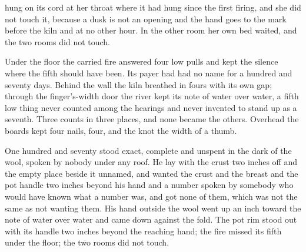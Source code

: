  hung on its cord at her throat where it had hung since the first firing, and she did not touch it, because a dusk is not an opening and the hand goes to the mark before the kiln and at no other hour. In the other room her own bed waited, and the two rooms did not touch.

Under the floor the carried fire answered four low pulls and kept the silence where the fifth should have been. Its payer had had no name for a hundred and seventy days. Behind the wall the kiln breathed in fours with its own gap; through the finger’s-width door the river kept its note of water over water, a fifth low thing never counted among the hearings and never invented to stand up as a seventh. Three counts in three places, and none became the others. Overhead the boards kept four nails, four, and the knot the width of a thumb.

One hundred and seventy stood exact, complete and unspent in the dark of the wool, spoken by nobody under any roof. He lay with the crust two inches off and the empty place beside it unnamed, and wanted the crust and the breast and the pot handle two inches beyond his hand and a number spoken by somebody who would have known what a number was, and got none of them, which was not the same as not wanting them. His hand outside the wool went up an inch toward the note of water over water and came down against the fold. The pot rim stood out with its handle two inches beyond the reaching hand; the fire missed its fifth under the floor; the two rooms did not touch.
